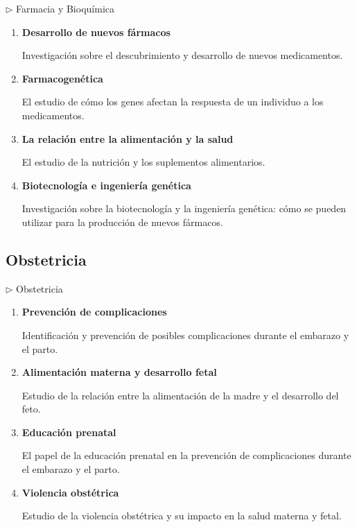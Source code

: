 \documentclass[12pt,a4paper]{article}
\begin{document}
\begin{careerbox}{$\triangleright$ Farmacia y Bioquímica}
	\begin{enumerate}
		\item \textbf{Desarrollo de nuevos fármacos}
		
		Investigación sobre el descubrimiento y desarrollo de nuevos medicamentos.
		
		\item \textbf{Farmacogenética}
		
		El estudio de cómo los genes afectan la respuesta de un individuo a los medicamentos.
		
		\item \textbf{La relación entre la alimentación y la salud}
		
		El estudio de la nutrición y los suplementos alimentarios.
		
		\item \textbf{Biotecnología e ingeniería genética}
		
		Investigación sobre la biotecnología y la ingeniería genética: cómo se pueden utilizar para la producción de nuevos fármacos.
	\end{enumerate}
\end{careerbox}

\subsection{Obstetricia}

\begin{careerbox}{$\triangleright$ Obstetricia}
	\begin{enumerate}
		\item \textbf{Prevención de complicaciones}
		
		Identificación y prevención de posibles complicaciones durante el embarazo y el parto.
		
		\item \textbf{Alimentación materna y desarrollo fetal}
		
		Estudio de la relación entre la alimentación de la madre y el desarrollo del feto.
		
		\item \textbf{Educación prenatal}
		
		El papel de la educación prenatal en la prevención de complicaciones durante el embarazo y el parto.
		
		\item \textbf{Violencia obstétrica}
		
		Estudio de la violencia obstétrica y su impacto en la salud materna y fetal.
	\end{enumerate}
\end{careerbox}
\end{document}
